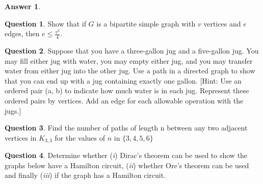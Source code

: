 \documentclass[article, 12pt]{article}
\theoremstyle{definition}
\newtheorem{question}{Question}
\newtheorem{answer}{Answer}
\begin{document}
    \begin{answer}
    
    \end{answer}

    \begin{question}
        Show that if $G$ is a bipartite simple graph with $v$ vertices and $e$ edges, then $e \leq \frac{v^2}4$.
    \end{question}

    \begin{question}
        Suppose that you have a three-gallon jug and a five-gallon jug. You may fill either jug with water, you may empty either jug, and you may transfer water from either jug into the other jug. Use a path in a directed graph to show that you can end up with a jug containing exactly one gallon. [Hint: Use an ordered pair (a, b) to indicate how much water is in each jug. Represent these ordered pairs by vertices. Add an edge for each allowable operation with the jugs.]
    \end{question}

    \begin{question}
        Find the number of paths of length n between any two adjacent vertices in $K_{3,3}$ for the values of $n$ in $\{3, 4, 5, 6\}$
    \end{question}

    \begin{question}
        Determine whether  ({\em i}) Dirac's theorem can be used to show  the graphs below have a Hamilton circuit, ({\em ii}) whether Ore's theorem can be used and finally ({\em iii}) if the graph has a Hamilton circuit.
        \begin{figure}[H]
            \centering
        \end{figure}
    \end{question}
\end{document}

